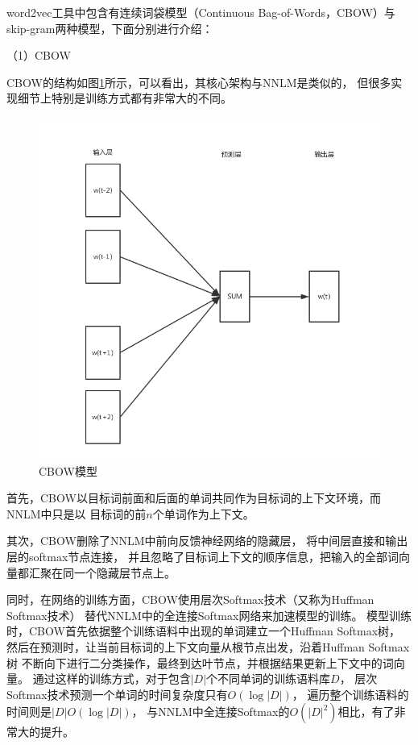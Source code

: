 word2vec工具中包含有连续词袋模型（Continuous Bag-of-Words，CBOW）与
skip-gram两种模型，下面分别进行介绍：

（1）CBOW

CBOW的结构如图\ref{cbow}所示，可以看出，其核心架构与NNLM是类似的，
但很多实现细节上特别是训练方式都有非常大的不同。
\begin{figure}[h]
    \includegraphics[scale=0.6]{picture/cbow.png}
    \caption{CBOW模型}
    \label{cbow}
\end{figure}

首先，CBOW以目标词前面和后面的单词共同作为目标词的上下文环境，而NNLM中只是以
目标词的前$n$个单词作为上下文。

其次，CBOW删除了NNLM中前向反馈神经网络的隐藏层，
将中间层直接和输出层的softmax节点连接，
并且忽略了目标词上下文的顺序信息，把输入的全部词向量都汇聚在同一个隐藏层节点上。

同时，在网络的训练方面，CBOW使用层次Softmax技术（又称为Huffman Softmax技术）
替代NNLM中的全连接Softmax网络来加速模型的训练。
模型训练时，CBOW首先依据整个训练语料中出现的单词建立一个Huffman Softmax树，
然后在预测时，让当前目标词的上下文向量从根节点出发，沿着Huffman Softmax树
不断向下进行二分类操作，最终到达叶节点，并根据结果更新上下文中的词向量。
通过这样的训练方式，对于包含$|D|$个不同单词的训练语料库$D$，
层次Softmax技术预测一个单词的时间复杂度只有$O\left ( \log|D| \right )$，
遍历整个训练语料的时间则是$|D|O\left ( \log|D| \right )$，
与NNLM中全连接Softmax的$O\left ( |D|^2 \right )$相比，有了非常大的提升。

